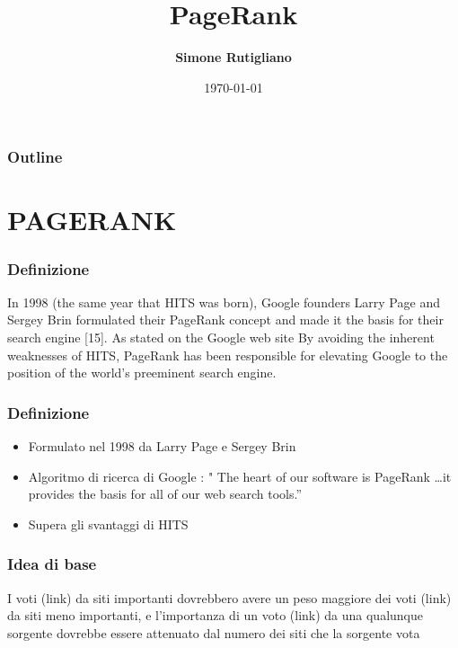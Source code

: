 \documentclass{beamer}
\title[PAGERANK]{PageRank}
\institute{
\begin{small}
Corso di Laurea in Informatica Magistrale
\end{small}}
\author{\textbf{Simone Rutigliano}}
\date{\tiny{\today}}
\begin{document}

\begin{frame}
\maketitle
\end{frame}


\begin{frame}
\frametitle{Outline}
	\tableofcontents
\end{frame}


\section{PAGERANK}
\begin{frame}
\frametitle{Definizione}
In 1998 (the same year that HITS was born), Google founders Larry Page and Sergey Brin formulated
their PageRank concept and made it the basis for their search engine [15]. As stated on the Google web
site
By avoiding the inherent weaknesses of HITS, PageRank has been responsible for elevating Google to the
position of the world's preeminent search engine.
\end{frame}


\begin{frame}
	\frametitle{Definizione}
	\begin{itemize}
		\item Formulato nel 1998 da Larry Page e Sergey Brin
		\item Algoritmo di ricerca di Google : " The heart of our software is PageRank \texttrademark\dots it provides the basis for all of our web search tools.''
		\item Supera gli svantaggi di HITS
	\end{itemize}
\end{frame}


\begin{frame}
	\frametitle{Idea di base}
	I voti (link) da siti importanti dovrebbero avere un peso maggiore dei voti (link) da siti meno importanti, e l'importanza di un voto (link) da una qualunque sorgente dovrebbe essere attenuato dal numero dei siti che la sorgente vota
\end{frame}
\end{document}
